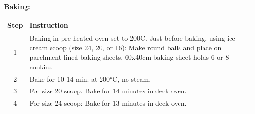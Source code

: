 \noindent\textbf{Baking:}
\begin{center}
\begin{tabular}{|c|p{12cm}|}
    \hline
    \textbf{Step} & \textbf{Instruction} \\
    \hline
    1 & Baking in pre-heated oven set to 200C. Just before baking, using ice cream scoop (size 24, 20, or 16): Make round balls and place on parchment lined baking sheets. 60x40cm baking sheet holds 6 or 8 cookies. \\
    \hline
    2 & Bake for 10-14 min. at 200°C, no steam. \\
    \hline
    3 & For size 20 scoop: Bake for 14 minutes in deck oven. \\
    \hline
    4 & For size 24 scoop: Bake for 13 minutes in deck oven. \\
    \hline
\end{tabular}
\end{center}
